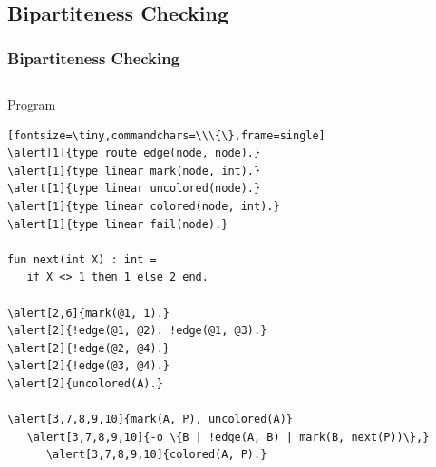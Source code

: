 \documentclass{beamer}
\let\oldalert\alert
\renewcommand{\alert}[2][]{%
  \if\relax\detokenize{#1}\relax%
    \oldalert{#2}%
  \else
    \oldalert<#1>{#2}%
  \fi}
\begin{document}
\subsection{Bipartiteness Checking}

\begin{frame}[fragile]
  \frametitle{Bipartiteness Checking}
  \begin{columns}[t]
     \begin{block}{Program}
       \begin{verbatim}[fontsize=\tiny,commandchars=\\\{\},frame=single]
\alert[1]{type route edge(node, node).}
\alert[1]{type linear mark(node, int).}
\alert[1]{type linear uncolored(node).}
\alert[1]{type linear colored(node, int).}
\alert[1]{type linear fail(node).}

fun next(int X) : int =
   if X <> 1 then 1 else 2 end.

\alert[2,6]{mark(@1, 1).}
\alert[2]{!edge(@1, @2). !edge(@1, @3).}
\alert[2]{!edge(@2, @4).}
\alert[2]{!edge(@3, @4).}
\alert[2]{uncolored(A).}

\alert[3,7,8,9,10]{mark(A, P), uncolored(A)}
   \alert[3,7,8,9,10]{-o \{B | !edge(A, B) | mark(B, next(P))\},}
      \alert[3,7,8,9,10]{colored(A, P).}


\end{verbatim}
\end{block}
\end{columns}
\end{frame}
\end{document}
